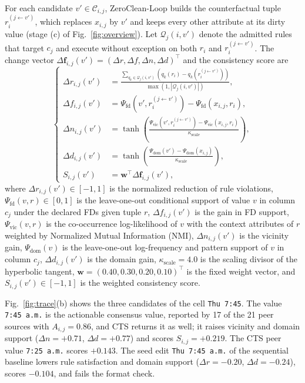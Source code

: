 \documentclass[conference]{IEEEtran}
\begin{document}
For each candidate $v' \in \mathcal{C}_{i,j}$, ZeroClean-Loop builds the counterfactual tuple $r_i^{(j \leftarrow v')}$, which replaces $x_{i,j}$ by $v'$ and keeps every other attribute at its dirty value (stage (c) of Fig.~\ref{fig:overview}). Let $\mathcal{Q}_j(i, v')$ denote the admitted rules that target $c_j$ and execute without exception on both $r_i$ and $r_i^{(j \leftarrow v')}$. The change vector $\Delta\mathbf{f}_{i,j}(v') = (\Delta r, \Delta f, \Delta n, \Delta d)^{\top}$ and the consistency score are
\begin{equation}
\label{eq:counterfactual_vector}
\left\{
\begin{aligned}
\Delta r_{i,j}(v') &= \frac{\sum_{q_k \in \mathcal{Q}_j(i, v')} \!\left(q_k(r_i) - q_k\!\left(r_i^{(j \leftarrow v')}\right)\right)}{\max\!\left(1, |\mathcal{Q}_j(i, v')|\right)}, \\
\Delta f_{i,j}(v') &= \Psi_{\mathrm{fd}}\!\left(v', r_i^{(j \leftarrow v')}\right) - \Psi_{\mathrm{fd}}\!\left(x_{i,j}, r_i\right), \\
\Delta n_{i,j}(v') &= \tanh\!\left(\frac{\Psi_{\mathrm{vic}}\!\left(v', r_i^{(j \leftarrow v')}\right) - \Psi_{\mathrm{vic}}\!\left(x_{i,j}, r_i\right)}{\kappa_{\mathrm{scale}}}\right), \\
\Delta d_{i,j}(v') &= \tanh\!\left(\frac{\Psi_{\mathrm{dom}}(v') - \Psi_{\mathrm{dom}}(x_{i,j})}{\kappa_{\mathrm{scale}}}\right), \\
S_{i,j}(v') &= \mathbf{w}^{\top} \Delta\mathbf{f}_{i,j}(v'),
\end{aligned}
\right.
\end{equation}
where $\Delta r_{i,j}(v') \in [-1,1]$ is the normalized reduction of rule violations, $\Psi_{\mathrm{fd}}(v, r) \in [0,1]$ is the leave-one-out conditional support of value $v$ in column $c_j$ under the declared FDs given tuple $r$, $\Delta f_{i,j}(v')$ is the gain in FD support, $\Psi_{\mathrm{vic}}(v, r)$ is the co-occurrence log-likelihood of $v$ with the context attributes of $r$ weighted by Normalized Mutual Information (NMI), $\Delta n_{i,j}(v')$ is the vicinity gain, $\Psi_{\mathrm{dom}}(v)$ is the leave-one-out log-frequency and pattern support of $v$ in column $c_j$, $\Delta d_{i,j}(v')$ is the domain gain, $\kappa_{\mathrm{scale}} = 4.0$ is the scaling divisor of the hyperbolic tangent, $\mathbf{w} = (0.40, 0.30, 0.20, 0.10)^{\top}$ is the fixed weight vector, and $S_{i,j}(v') \in [-1,1]$ is the weighted consistency score.

Fig.~\ref{fig:trace}(b) shows the three candidates of the cell \texttt{Thu 7:45}. The value \texttt{7:45 a.m.} is the actionable consensus value, reported by 17 of the 21 peer sources with $A_{i,j} = 0.86$, and CTS returns it as well; it raises vicinity and domain support ($\Delta n = +0.71$, $\Delta d = +0.77$) and scores $S_{i,j} = +0.219$. The CTS peer value \texttt{7:25 a.m.} scores $+0.143$. The seed edit \texttt{Thu 7:45 a.m.} of the sequential baseline lowers rule satisfaction and domain support ($\Delta r = -0.20$, $\Delta d = -0.24$), scores $-0.104$, and fails the format check.
\end{document}
